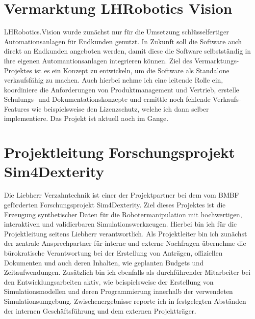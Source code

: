 \documentclass[11pt,a4paper]{moderncv}
\begin{document}
\section{Vermarktung LHRobotics Vision} 
LHRobotics.Vision wurde zunächst nur für die Umsetzung schlüsselfertiger Automationsanlagen für Endkunden genutzt. In Zukunft soll die Software auch direkt an Endkunden angeboten werden, damit diese die Software selbstständig in ihre eigenen Automantionsanlagen integrieren können. Ziel des Vermarktungs-Projektes ist es ein Konzept zu entwickeln, um die Software als Standalone verkaufsfähig zu machen. Auch hierbei nehme ich eine leitende Rolle ein, koordiniere die Anforderungen von Produktmanagement und Vertrieb, erstelle Schulungs- und Dokumentationskonzepte und ermittle noch fehlende Verkaufs-Features wie beispielsweise den Lizenzschutz, welche ich dann selber implementiere. Das Projekt ist aktuell noch im Gange.

\newpage

\section{Projektleitung Forschungsprojekt Sim4Dexterity} 
Die Liebherr Verzahntechnik ist einer der Projektpartner bei dem vom BMBF geförderten Forschungsprojekt Sim4Dexterity. Ziel dieses Projektes ist die Erzeugung synthetischer Daten für die Robotermanipulation mit hochwertigen, interaktiven und validierbaren Simulationswerkzeugen. Hierbei bin ich für die Projektleitung seitens Liebherr verantwortlich. Als Projektleiter bin ich zunächst der zentrale Ansprechpartner für interne und externe Nachfragen übernehme die bürokratische Verantwortung bei der Erstellung von Anträgen, offiziellen Dokumenten und auch deren Inhalten, wie geplanten Budgets und Zeitaufwendungen. Zusätzlich bin ich ebenfalls als durchführender Mitarbeiter bei den Entwicklungsarbeiten aktiv, wie beispielsweise der Erstellung von Simulationsmodellen und deren Programmierung innerhalb der verwendeten Simulationsumgebung. Zwischenergebnisse reporte ich in festgelegten Abständen der internen Geschäftsführung und dem externen Projektträger.
\end{document}

